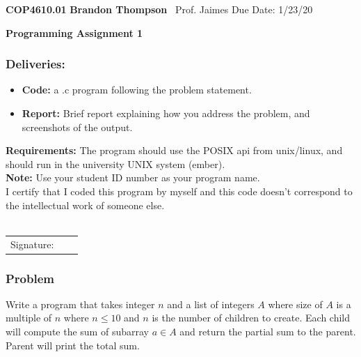 \documentclass[12pt]{article}
\begin{document}
\noindent
\textbf{COP4610.01} \hfill \textbf{Brandon Thompson} \
\normalsize Prof. Jaimes \hfill Due Date: 1/23/20 \

\begin{center}
\textbf{Programming Assignment 1}
\end{center}
	\subsubsection*{Deliveries:}
	\begin{itemize}
		\item \textbf{Code:} a .c program following the problem statement.
		\item \textbf{Report:} Brief report explaining how you address
			the problem, and screenshots of the output.
	\end{itemize}
	\textbf{Requirements:} The program should use the POSIX api from unix/linux,
	and should run in the university UNIX system (ember).\\
	\textbf{Note:} Use your student ID number as your program name.\\
	\hline
	I certify that I coded this program by myself and this code doesn't correspond
	to the intellectual work of someone else.\\\\
	\begin{tabular}{@{}p{.5in}p{4in}@{}}
		Signature:  & \ \ \hrulefill \\
	\end{tabular}

	\subsubsection*{Problem} 
	Write a program that takes integer $n$ and a list of integers $A$ where
	size of $A$ is a multiple of $n$ where $n \le 10$ and $n$ is the number of children
	to create. Each child will compute the sum of subarray $a \in A$ and
	return the partial sum to the parent. Parent will print the total sum.
	\clearpage	
\end{document}
